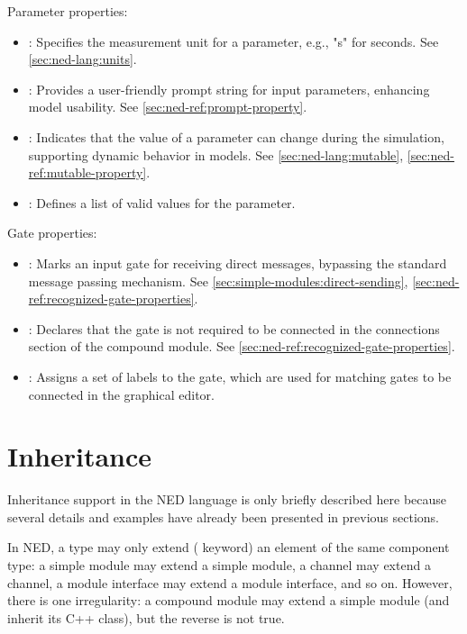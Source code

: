 Parameter properties:

\begin{itemize}
  \item {}: Specifies the measurement unit for a
    parameter, e.g., "s" for seconds. See \ref{sec:ned-lang:units}.
  \item {}: Provides a user-friendly prompt string for
    input parameters, enhancing model usability. See
    \ref{sec:ned-ref:prompt-property}.
  \item {}: Indicates that the value of a parameter can change
    during the simulation, supporting dynamic behavior in models. See
    \ref{sec:ned-lang:mutable}, \ref{sec:ned-ref:mutable-property}.
  \item {}: Defines a list of valid values for the
    parameter.
\end{itemize}

Gate properties:

\begin{itemize}
  \item {}: Marks an input gate for receiving direct messages,
    bypassing the standard message passing mechanism. See
    \ref{sec:simple-modules:direct-sending},
    \ref{sec:ned-ref:recognized-gate-properties}.
  \item {}: Declares that the gate is not required to be connected
    in the connections section of the compound module. See
    \ref{sec:ned-ref:recognized-gate-properties}.
  \item {}: Assigns a set of labels to the gate, which
    are used for matching gates to be connected in the graphical editor.
\end{itemize}


\section{Inheritance}
\label{sec:ned-lang:inheritance}

Inheritance support in the NED language is only briefly described here because
several details and examples have already been presented in previous sections.

In NED, a type may only extend ( keyword) an element of the
same component type: a simple module may extend a simple module, a channel may
extend a channel, a module interface may extend a module interface, and so on.
However, there is one irregularity: a compound module may extend a simple module
(and inherit its C++ class), but the reverse is not true.

